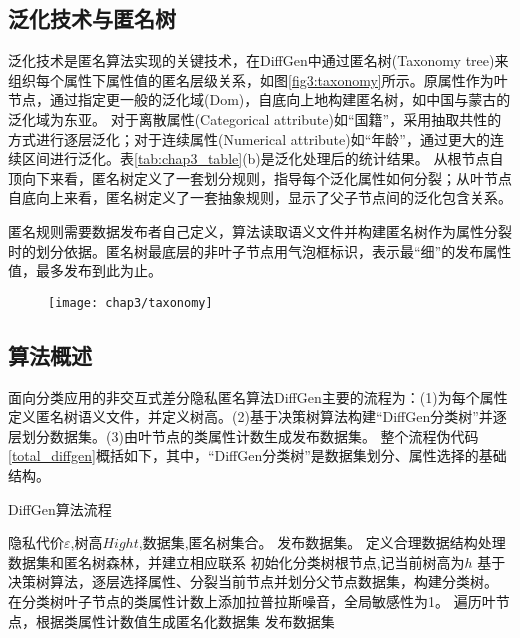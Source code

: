 \subsection{泛化技术与匿名树}

泛化技术是匿名算法实现的关键技术，在DiffGen中通过匿名树(Taxonomy tree)来组织每个属性下属性值的匿名层级关系，如图\ref{fig3:taxonomy}所示。原属性作为叶节点，通过指定更一般的泛化域(Dom)\supercite{dom}，自底向上地构建匿名树，如中国与蒙古的泛化域为东亚。
对于离散属性(Categorical attribute)如“国籍”，采用抽取共性的方式进行逐层泛化；对于连续属性(Numerical attribute)如“年龄”，通过更大的连续区间进行泛化。表\ref{tab:chap3_table}(b)是泛化处理后的统计结果。
从根节点自顶向下来看，匿名树定义了一套划分规则，指导每个泛化属性如何分裂；从叶节点自底向上来看，匿名树定义了一套抽象规则，显示了父子节点间的泛化包含关系。

匿名规则需要数据发布者自己定义，算法读取语义文件并构建匿名树作为属性分裂时的划分依据。匿名树最底层的非叶子节点用气泡框标识，表示最“细”的发布属性值，最多发布到此为止。

\begin{figure}[!htp]
	\centering
	\texttt{[image: chap3/taxonomy]}
\end{figure}


\subsection{算法概述}

面向分类应用的非交互式差分隐私匿名算法DiffGen主要的流程为：(1)为每个属性定义匿名树语义文件，并定义树高。(2)基于决策树算法构建“DiffGen分类树”并逐层划分数据集。(3)由叶节点的类属性计数生成发布数据集。
整个流程伪代码\ref{total_diffgen}概括如下，其中，“DiffGen分类树”是数据集划分、属性选择的基础结构。

\begin{algorithm}[H]
	\caption{DiffGen算法流程} 
	\label{total_diffgen}
	\begin{algorithmic}[1]
		\REQUIRE 隐私代价$\varepsilon$,树高$Hight$,数据集,匿名树集合。
		\ENSURE 发布数据集。
		\STATE 定义合理数据结构处理数据集和匿名树森林，并建立相应联系
		\STATE 初始化分类树根节点,记当前树高为$h$
		\STATE 基于决策树算法，逐层选择属性、分裂当前节点并划分父节点数据集，构建分类树。
		\ENDWHILE
		\STATE 在分类树叶子节点的类属性计数上添加拉普拉斯噪音，全局敏感性为1。
		\STATE 遍历叶节点，根据类属性计数值生成匿名化数据集
		\RETURN 发布数据集
	\end{algorithmic}
\end{algorithm}


